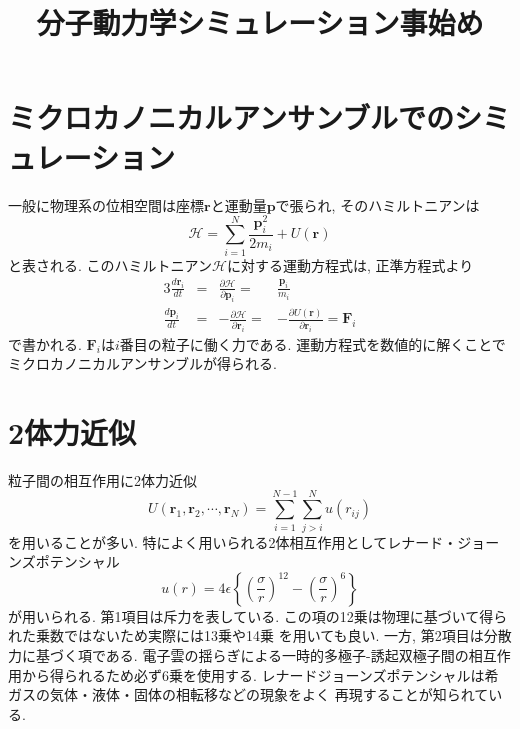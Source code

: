 





\title{分子動力学シミュレーション事始め}
\maketitle

\section{ミクロカノニカルアンサンブルでのシミュレーション}
一般に物理系の位相空間は座標$\bm{r}$と運動量$\bm{p}$で張られ,
そのハミルトニアンは
\begin{equation}
 \mathcal{H}
 =
 \sum_{i=1}^{N} \frac{\bm{p}_{i}^{2}}{2 m_{i}} + U(\bm{r})
\end{equation}
と表される. このハミルトニアン$\mathcal{H}$に対する運動方程式は, 正準方程式より
\begin{alignat}{3}
   \frac{d \bm{r}_{i}}{dt}
&=&\frac{\partial{\mathcal{H}}}{\partial{\bm{p}_{i}}}
 =&\frac{\bm{p}_{i}}{m_{i}}
  \label{eq:HamiltonEq1}
   \\
   \frac{d \bm{p}_{i}}{dt}
&=&-\frac{\partial{\mathcal{H}}}{\partial{\bm{r}_{i}}}
 =&-\frac{\partial{U(\bm{r})}}{\partial{\bm{r}}_{i}}
 =\bm{F}_{i}
  \label{eq:HamiltonEq2}
\end{alignat}
で書かれる. $\bm{F}_{i}$は$i$番目の粒子に働く力である.
運動方程式を数値的に解くことでミクロカノニカルアンサンブルが得られる.

\section{2体力近似}
粒子間の相互作用に2体力近似
\begin{equation}
 U(\bm{r}_{1}, \bm{r}_{2}, \cdots, \bm{r}_{N})
=\sum_{i=1}^{N-1} \sum_{j > i}^{N} u(r_{ij})
\end{equation}
を用いることが多い.
特によく用いられる2体相互作用としてレナード・ジョーンズポテンシャル
\begin{equation}
 u(r)
=4\epsilon
  \left\{
          \left(\frac{\sigma}{r}\right)^{12}
         -\left(\frac{\sigma}{r}\right)^{6}
 \right\}
\end{equation}
が用いられる.
第1項目は斥力を表している.
この項の12乗は物理に基づいて得られた乗数ではないため実際には13乗や14乗
を用いても良い.
一方, 第2項目は分散力に基づく項である.
電子雲の揺らぎによる一時的多極子-誘起双極子間の相互作用から得られるため必ず6乗を使用する.
レナードジョーンズポテンシャルは希ガスの気体・液体・固体の相転移などの現象をよく
再現することが知られている.

